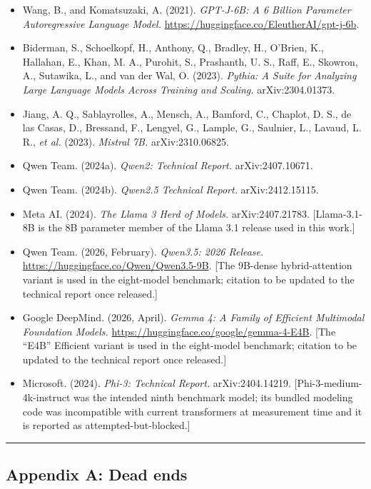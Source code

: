 \begin{itemize}
\tightlist
\item
  Wang, B., and Komatsuzaki, A. (2021). \emph{GPT-J-6B: A 6 Billion
  Parameter Autoregressive Language Model.}
  \url{https://huggingface.co/EleutherAI/gpt-j-6b}.
\item
  Biderman, S., Schoelkopf, H., Anthony, Q., Bradley, H., O'Brien, K.,
  Hallahan, E., Khan, M. A., Purohit, S., Prashanth, U. S., Raff, E.,
  Skowron, A., Sutawika, L., and van der Wal, O. (2023). \emph{Pythia: A
  Suite for Analyzing Large Language Models Across Training and
  Scaling.} arXiv:2304.01373.
\item
  Jiang, A. Q., Sablayrolles, A., Mensch, A., Bamford, C., Chaplot, D.
  S., de las Casas, D., Bressand, F., Lengyel, G., Lample, G., Saulnier,
  L., Lavaud, L. R., \emph{et al.} (2023). \emph{Mistral 7B.}
  arXiv:2310.06825.
\item
  Qwen Team. (2024a). \emph{Qwen2: Technical Report.} arXiv:2407.10671.
\item
  Qwen Team. (2024b). \emph{Qwen2.5 Technical Report.} arXiv:2412.15115.
\item
  Meta AI. (2024). \emph{The Llama 3 Herd of Models.} arXiv:2407.21783.
  {[}Llama-3.1-8B is the 8B parameter member of the Llama 3.1 release
  used in this work.{]}
\item
  Qwen Team. (2026, February). \emph{Qwen3.5: 2026 Release.}
  \url{https://huggingface.co/Qwen/Qwen3.5-9B}. {[}The 9B-dense
  hybrid-attention variant is used in the eight-model benchmark;
  citation to be updated to the technical report once released.{]}
\item
  Google DeepMind. (2026, April). \emph{Gemma 4: A Family of Efficient
  Multimodal Foundation Models.}
  \url{https://huggingface.co/google/gemma-4-E4B}. {[}The ``E4B''
  Efficient variant is used in the eight-model benchmark; citation to be
  updated to the technical report once released.{]}
\item
  Microsoft. (2024). \emph{Phi-3: Technical Report.} arXiv:2404.14219.
  {[}Phi-3-medium-4k-instruct was the intended ninth benchmark model;
  its bundled modeling code was incompatible with current transformers
  at measurement time and it is reported as attempted-but-blocked.{]}
\end{itemize}

\begin{center}\rule{0.5\linewidth}{0.5pt}\end{center}

\subsection{Appendix A: Dead ends}\label{appendix-a-dead-ends}

